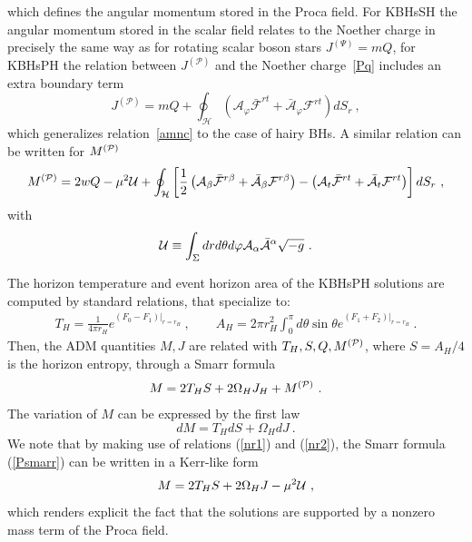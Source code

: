 which defines the angular momentum stored in the Proca field.
For KBHsSH the angular momentum stored in the scalar field relates to the Noether charge in precisely the same way as for rotating scalar boson stars $J^{(\Psi)}=mQ$, for KBHsPH the relation between $J^{(\mathcal{P})} $ and  the Noether charge~\eqref{Pq} includes an extra boundary term
\begin{equation}
\label{nr1}
J^{(\mathcal{P})}=mQ+ \oint_\mathcal{H}  ({\mathcal{A}}_\varphi \bar{ {\mathcal{F}}}^{r t}+\bar{\mathcal{A}}_\varphi { {\mathcal{F}}}^{r t}  ) dS_r \ ,
\end{equation}
which generalizes relation~\eqref{amnc} to the case of hairy BHs. 
A similar relation can be written for $M^{({\cal P})}$
\begin{equation}
\label{nr2}
M^{({\cal P})}=2w Q
-\mu^2  {\cal U}
+ \oint_\mathcal{H}  
\left[
\frac{1}{2} 
\left(
{\mathcal{A}}_\beta \bar{ {\mathcal{F}}}^{r \beta}+\bar{\mathcal{A}}_\beta { {\mathcal{F}}}^{r \beta}
\right)
-\left({\mathcal{A}}_t \bar{ {\mathcal{F}}}^{r t}+\bar{\mathcal{A}}_t { {\mathcal{F}}}^{r t}
\right)  
\right] dS_r \ ,
\end{equation}
with
\begin{equation}
\label{ProcaU}
{\cal U}\equiv \int _\Sigma  dr d\theta d\varphi  {\mathcal{A}}_\alpha \bar {\mathcal{A}}^\alpha \sqrt{-g}\ .
\end{equation}


The horizon temperature and event horizon area of the KBHsPH solutions are computed by standard relations, that specialize to: 
\begin{eqnarray}
\label{PTHAH}
T_H=\frac{1}{4\pi r_H}e^{(F_0-F_1)|_{r=r_H}} \ , \qquad
 A_H=2\pi r_H^2 \int_0^\pi d\theta \sin \theta  e^{(F_1+F_2)|_{r=r_H}}\ . 
 \end{eqnarray}
Then, the ADM quantities $M,J$ are related with $T_H,S,Q,M^{({\cal P})}$, where $S=A_H/4$ is the horizon entropy, through a Smarr formula  
%
\begin{eqnarray}
\label{Psmarr} 
M=2 T_H S +2\Omega_H J_H+ M^{({\cal P})} \ .
\end{eqnarray}
The variation of $M$ can be expressed by the first law
\begin{equation}
\label{fl}
dM=T_H dS +\Omega_H dJ \ .
\end{equation}
We note that
by making use of relations
(\ref{nr1})
and
(\ref{nr2}),
 the Smarr formula (\ref{Psmarr})
can be written in a Kerr-like form
\begin{eqnarray}
\label{smarr-new1} 
M=2 T_H S +2\Omega_H J-\mu^2 {\cal U} \ ,
\end{eqnarray}
which renders explicit the fact that the solutions are supported by
a nonzero mass term of the Proca field.

